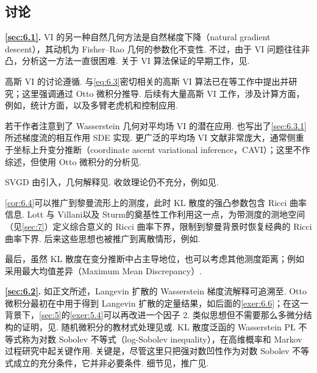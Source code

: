 \subsection{讨论}\label{sec:6.7}

\noindent\textbf{\autoref{sec:6.1}.} VI 的另一种自然几何方法是自然梯度下降（natural gradient descent），其动机为 Fisher--Rao 几何的参数化不变性\cite{ref15,ref16}. 不过，由于 VI 问题往往非凸，分析这一方法一直很困难. 关于 VI 算法保证的早期工作，见\cite{ref25}.

高斯 VI 的讨论遵循\cite{ref192}. 与\eqref{eq:6.3}密切相关的高斯 VI 算法已在\cite{ref8,ref116,ref137}等工作中提出并研究；这里强调通过 Otto 微积分推导. 后续有大量高斯 VI 工作，涉及计算方面，例如\cite{ref47,ref110,ref117,ref176}，统计方面\cite{ref175}，以及多臂老虎机\cite{ref89}和控制应用\cite{ref193,ref194}.

若干作者注意到了 Wasserstein 几何对平均场 VI 的潜在应用\cite{ref148,ref190,ref328}. \cite{ref148,ref190}也写出了\autoref{sec:6.3.1}所述梯度流的相互作用 SDE 实现. 更广泛的平均场 VI 文献非常庞大，通常侧重于坐标上升变分推断（coordinate ascent variational inference，CAVI）；这里不作综述，但使用 Otto 微积分的分析见\cite{ref23,ref195}.

SVGD 由\cite{ref213}引入，几何解释见\cite{ref79,ref124,ref212}. 收敛理论仍不充分，例如见\cite{ref101,ref186,ref215,ref265,ref279,ref285}.

\autoref{cor:6.4}可以推广到黎曼流形上的测度，此时 KL 散度的强凸参数包含 Ricci 曲率信息. Lott 与 Villani\cite{ref214}以及 Sturm\cite{ref294,ref295}的奠基性工作利用这一点，为带测度的测地空间（见\autoref{sec:7}）定义综合意义的 Ricci 曲率下界，限制到黎曼背景时恢复经典的 Ricci 曲率下界. 后来这些思想也被推广到离散情形，例如\cite{ref246,ref247,ref248}.

最后，虽然 KL 散度在变分推断中占主导地位，也可以考虑其他测度距离；例如\cite{ref21}采用最大均值差异（Maximum Mean Discrepancy）.

\noindent\textbf{\autoref{sec:6.2}.} 如正文所述，Langevin 扩散的 Wasserstein 梯度流解释可追溯至\cite{ref170}. Otto 微积分最初在\cite{ref250}中用于得到 Langevin 扩散的定量结果，如后面的\autoref{exer:6.6}；在这一背景下，\autoref{sec:5}的\autoref{exer:5.4}可以再改进一个因子 2\cite{ref43,ref251}. 类似思想但不需要那么多微分结构的证明，见\cite{ref92}. 随机微积分的教材式处理见\cite{ref291}或\cite{ref196}. KL 散度泛函的 Wasserstein PŁ 不等式称为对数 Sobolev 不等式（log-Sobolev inequality），在高维概率和 Markov 过程研究中起关键作用. 关键是，尽管这里只把强对数凹性作为对数 Sobolev 不等式成立的充分条件，它并非必要条件. 细节见\cite{ref30}，推广见\cite{ref39,ref243,ref244}.

